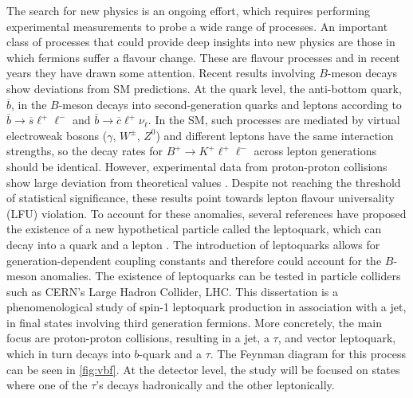The search for new physics is an ongoing effort, which requires performing experimental measurements to probe a wide range of processes. An important class of processes that could provide deep insights into new physics are those in which fermions suffer a flavour change. These are flavour processes and in recent years they have drawn some attention. Recent results involving $B$-meson decays show deviations from SM predictions. At the quark level, the anti-bottom quark, $\overline{b}$, in the $B$-meson decays into second-generation quarks and leptons according to $\overline{b}\rightarrow \overline{s}\ell^+ \ell^-$ and $\overline{b}\rightarrow \overline{c}\ell^+ \nu_\ell$. In the SM, such processes are mediated by virtual electroweak bosons ($\gamma$, $W^\pm$, $Z^0$) and different leptons have the same interaction strengths, so the decay rates for $B^+ \rightarrow K^+\ell^+\ell^-$ across lepton generations should be identical. However, experimental data from proton-proton collisions show large deviation from theoretical values \cite{lhcbcollaboration2021test, lhcb_measurement}. Despite not reaching the threshold of statistical significance, these results point towards lepton flavour universality (LFU) violation. To account for these anomalies, several references have proposed the existence of a new hypothetical particle called the leptoquark, which can decay into a quark and a lepton \cite{alonso_lepton_2015,fajfer_vector_2016,assad_baryon_2018,blanke_b_2018,barbieri_b-decay_2018,calibbi_model_2018,di_luzio_gauge_2017,bhattacharya_simultaneous_2017}. The introduction of leptoquarks allows for generation-dependent coupling constants and therefore could account for the $B$-meson anomalies. The existence of leptoquarks can be tested in particle colliders such as CERN's Large Hadron Collider, LHC. This dissertation is a phenomenological study of spin-1 leptoquark production in association with a jet, in final states involving third generation fermions. More concretely, the main focus are proton-proton collisions, resulting in a jet, a $\tau$, and vector leptoquark, which in turn decays into $b$-quark and a $\tau$. The Feynman diagram for this process can be seen in \ref{fig:vbf}. At the detector level, the study will be focused on states where one of the $\tau$'s decays hadronically and the other leptonically. 

